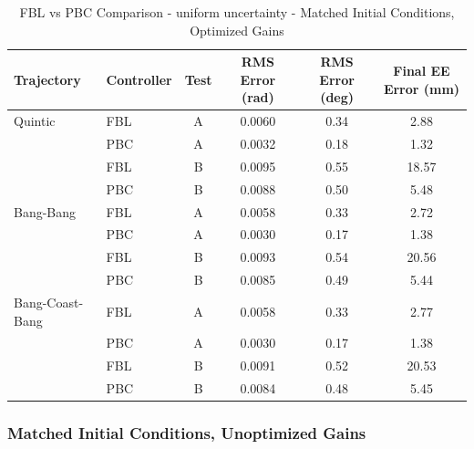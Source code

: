\documentclass[11pt,a4paper]{article}
\begin{document}
\begin{table}[H]
\centering
\caption{FBL vs PBC Comparison - uniform uncertainty - Matched Initial Conditions, Optimized Gains}
\begin{tabular}{llcccc}
\toprule
Trajectory & Controller & Test & RMS Error (rad) & RMS Error (deg) & Final EE Error (mm) \\
\midrule
Quintic & FBL & A & 0.0060 & 0.34 & 2.88 \\
 & PBC & A & \textcolor{bestcolor}{0.0032} & \textcolor{bestcolor}{0.18} & \textcolor{bestcolor}{1.32} \\
 & FBL & B & 0.0095 & 0.55 & 18.57 \\
 & PBC & B & \textcolor{bestcolor}{0.0088} & \textcolor{bestcolor}{0.50} & \textcolor{bestcolor}{5.48} \\
\midrule
Bang-Bang & FBL & A & 0.0058 & 0.33 & 2.72 \\
 & PBC & A & \textcolor{bestcolor}{0.0030} & \textcolor{bestcolor}{0.17} & \textcolor{bestcolor}{1.38} \\
 & FBL & B & 0.0093 & 0.54 & 20.56 \\
 & PBC & B & \textcolor{bestcolor}{0.0085} & \textcolor{bestcolor}{0.49} & \textcolor{bestcolor}{5.44} \\
\midrule
Bang-Coast-Bang & FBL & A & 0.0058 & 0.33 & 2.77 \\
 & PBC & A & \textcolor{bestcolor}{0.0030} & \textcolor{bestcolor}{0.17} & \textcolor{bestcolor}{1.38} \\
 & FBL & B & 0.0091 & 0.52 & 20.53 \\
 & PBC & B & \textcolor{bestcolor}{0.0084} & \textcolor{bestcolor}{0.48} & \textcolor{bestcolor}{5.45} \\
\bottomrule
\end{tabular}
\end{table}

\subsubsection{Matched Initial Conditions, Unoptimized Gains}
\end{document}
